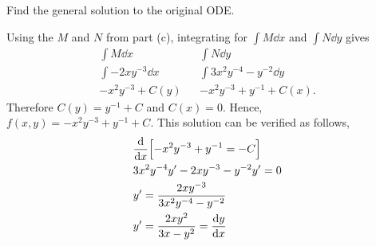 Find the general solution to the original ODE.

\nl Using the $M$ and $N$ from part (c), integrating for $\int M \dd x$ and $\int N \dd y$ gives
\begin{align*}
    \int M \dd x && \int N \dd y \\
    \int -2xy^{-3} \dd x && \int 3x^2 y^{-4} - y^{-2} \dd y\\
    -x^2 y^{-3} + C(y) && -x^2y^{-3} + y^{-1} + C(x).
\end{align*}
Therefore $C(y) = y^{-1} + C$ and $C(x) = 0$. Hence, $f(x,y) = -x^2y^{-3} + y^{-1} + C$.
This solution can be verified as follows,
\begin{align*}
    & \dv{x} \Big[ { -x^2y^{-3} + y^{-1} = -C} \Big] \\
    & 3x^2y^{-4}y' - 2xy^{-3} -y^{-2}y' = 0\\
    & y' = \frac{2xy^{-3}}{3x^2y^{-4}-y^{-2}}\\
    & y' = \frac{2xy^2}{3x-y^2} = \dv{y}{x}\\
\end{align*}